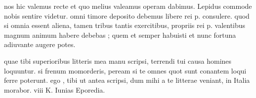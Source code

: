 


 nos hic valemus recte et quo melius valeamus operam dabimus. Lepidus commode nobis sentire videtur. omni timore deposito debemus libere rei p. consulere. quod si omnia essent aliena, tamen tribus tantis exercitibus, propriis rei p. valentibus magnum animum habere debebas ; quem et semper habuisti et nunc fortuna adiuvante augere potes.

 quae tibi superioribus litteris mea manu scripsi, terrendi tui causa homines loquuntur. si frenum momorderis, peream si te omnes quot sunt conantem loqui ferre poterunt. ego , tibi ut antea scripsi, dum mihi a te litterae veniant, in Italia morabor. viii K. Iunias Eporedia.
